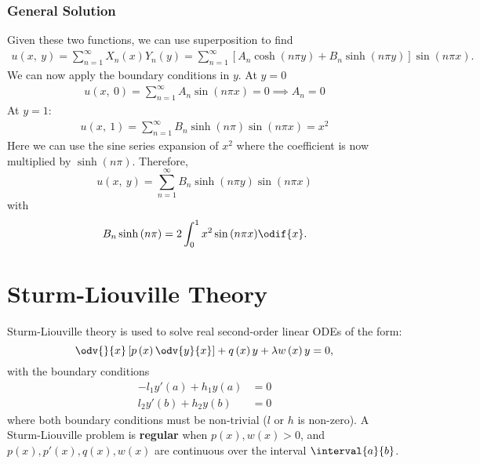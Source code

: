 \documentclass{article}
\begin{document}
\subsubsection{General Solution}
Given these two functions, we can use superposition to find
\begin{align*}
    u\left( x,\: y \right) = \sum_{n = 1}^\infty X_n\left( x \right) Y_n\left( y \right) = \sum_{n = 1}^\infty \left[ A_n \cosh{\left( n \pi y \right)} + B_n \sinh{\left( n \pi y \right)} \right] \sin{\left( n \pi x \right)}.
\end{align*}
We can now apply the boundary conditions in \(y\). At \(y = 0\)
\begin{align*}
    u\left( x,\: 0 \right) = \sum_{n = 1}^\infty A_n \sin{\left( n \pi x \right)} = 0 \implies A_n = 0
\end{align*}
At \(y = 1\):
\begin{align*}
    u\left( x,\: 1 \right) = \sum_{n = 1}^\infty B_n \sinh{\left( n \pi \right)} \sin{\left( n \pi x \right)} = x^2
\end{align*}
Here we can use the sine series expansion of \(x^2\) where the coefficient is now multiplied by \(\sinh{\left( n \pi \right)}\).
Therefore,
\begin{equation*}
    u\left( x,\: y \right) = \sum_{n = 1}^\infty B_n \sinh{\left( n \pi y \right)} \sin{\left( n \pi x \right)}
\end{equation*}
with
\begin{equation*}
    B_n \sinh{\left( n \pi \right)} = 2 \int_0^1 x^2 \sin{\left( n \pi x \right)} \odif{x}.
\end{equation*}
\section{Sturm-Liouville Theory}
Sturm-Liouville theory is used to solve real second-order linear ODEs
of the form:
\begin{equation*}
    \odv{}{x} \left[ p\left( x \right) \odv{y}{x} \right] + q\left( x \right) y + \lambda w\left( x \right) y = 0,
\end{equation*}
with the boundary conditions
\begin{align*}
    -l_1 y'\left( a \right) + h_1 y\left( a \right) & = 0 \\
    l_2 y'\left( b \right) + h_2 y\left( b \right)  & = 0
\end{align*}
where both boundary conditions must be non-trivial (\(l\) or \(h\) is non-zero). A Sturm-Liouville problem is
\textbf{regular} when \(p\left( x \right), w\left( x \right) > 0\), and \(p\left( x \right), p'\left( x \right), q\left( x \right), w\left( x \right)\) are continuous
over the interval \(\interval{a}{b}\).
\end{document}
